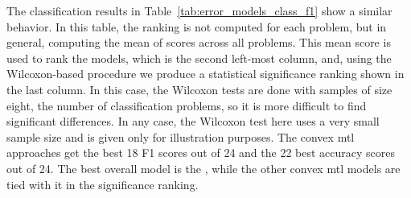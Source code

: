The classification results in Table~\ref{tab:error_models_class_f1} show a similar behavior. In this table, the ranking is not computed for each problem, but in general, computing the mean of scores across all problems. This mean score is used to rank the models, which is the second left-most column, and, using the Wilcoxon-based procedure we produce a statistical significance ranking shown in the last column. In this case, the Wilcoxon tests are done with samples of size eight, the number of classification problems, so it is more difficult to find significant differences. In any case, the Wilcoxon test here uses a very small sample size and is given only for illustration purposes.
The convex \acrshort{mtl} approaches get the best 18 F1 scores out of 24 and the 22 best accuracy scores out of 24. The best overall model is the , while the other convex \acrshort{mtl} models are tied with it in the significance ranking.

















































































































